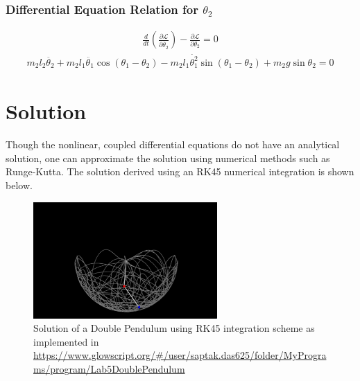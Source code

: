 \documentclass[12pt]{article}
\newcommand{\Lagr}{\mathcal{L}}
\begin{document}
\subsubsection{Differential Equation Relation for \(\theta_2\)}
\begin{align}
    \frac{d}{dt} \left( \frac{\partial \Lagr}{\partial \dot{\theta_2}} \right) - \frac{\partial \Lagr}{\partial \theta_2} = 0
\end{align}
\begin{align}
    m_2 l_2 \ddot{\theta_2} + m_2 l_1 \ddot{\theta_1} \cos (\theta_1 - \theta_2) - m_2 l_1 \dot{\theta_1^2} \sin (\theta_1 - \theta_2) + m_2 g \sin \theta_2 = 0
\end{align}

\section{Solution}
Though the nonlinear, coupled differential equations do not have an analytical solution, one can approximate the solution using numerical methods such as Runge-Kutta. The solution derived using an RK45 numerical integration is shown below.

\begin{figure}[H]
    \centering
    \includegraphics[width=70mm,height=\textheight,keepaspectratio]{images/double_pendulum_solution.png}
    \caption{Solution of a Double Pendulum using RK45 integration scheme as implemented in \url{https://www.glowscript.org/#/user/saptak.das625/folder/MyPrograms/program/Lab5DoublePendulum}}
    \label{fig:double_pendulum}
\end{figure}
\end{document}
